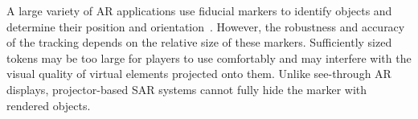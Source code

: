 \documentclass[10pt,twocolumn,letterpaper]{article}
\begin{document}
%
%
%
A large variety of AR applications use fiducial markers to identify
objects and determine their position and orientation~\cite{Kato1999,
  Fiala2005}.
%
However, the robustness and accuracy of the tracking depends
on the relative size of these markers.
Sufficiently sized tokens may be
too large 
for players to use comfortably
and 
may interfere with the visual quality of virtual elements projected
onto them.  Unlike see-through AR displays, projector-based SAR
systems cannot fully hide the marker with rendered objects.
\end{document}

